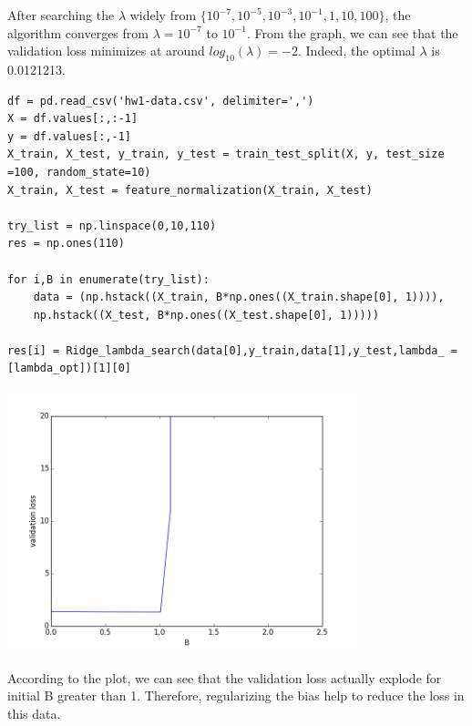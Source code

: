 \documentclass{article}
\newenvironment{sub}[2][$-$]{\begin{trivlist}
		\item[\hskip \labelsep {\bfseries #1}\hskip \labelsep {\bfseries #2.}]}  {\end{trivlist}}
\begin{document}
After searching the $\lambda$ widely from $\{ 10^{-7},10^{-5},10^{-3},10^{-1},1,10,100 \}$, the algorithm converges  from $\lambda = 10^{-7}$ to $10^{-1}$. From the graph, we can see that the validation loss minimizes at around $log_{10}(\lambda) = -2$. Indeed, the optimal $\lambda$ is 0.0121213.

\begin{sub}{2.5.6}
\end{sub}

\begin{verbatim}
df = pd.read_csv('hw1-data.csv', delimiter=',')
X = df.values[:,:-1]
y = df.values[:,-1]
X_train, X_test, y_train, y_test = train_test_split(X, y, test_size =100, random_state=10)
X_train, X_test = feature_normalization(X_train, X_test)

try_list = np.linspace(0,10,110)
res = np.ones(110)

for i,B in enumerate(try_list):
	data = (np.hstack((X_train, B*np.ones((X_train.shape[0], 1)))),
	np.hstack((X_test, B*np.ones((X_test.shape[0], 1)))))

res[i] = Ridge_lambda_search(data[0],y_train,data[1],y_test,lambda_ = [lambda_opt])[1][0]

\end{verbatim}

\begin{center}
	\includegraphics[height = 3in]{2_5_6.png}
\end{center}

According to the plot, we can see that the validation loss actually explode for initial B greater than 1. Therefore, regularizing the bias help to reduce the loss in this data. 

\begin{sub}{2.5.7}
\end{sub}
\end{document}

